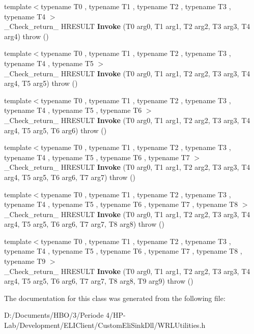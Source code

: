 \begin{DoxyCompactItemize}
{\footnotesize template$<$typename T0 , typename T1 , typename T2 , typename T3 , typename T4 $>$ }\\\+\_\+\+Check\+\_\+return\+\_\+ H\+R\+E\+S\+U\+LT {\bfseries Invoke} (T0 arg0, T1 arg1, T2 arg2, T3 arg3, T4 arg4)  throw ()
\item 
\mbox{\label{class_context_event_wrapper_a3d86a67a3676160dd8ed4d17c3fb8407}} 
{\footnotesize template$<$typename T0 , typename T1 , typename T2 , typename T3 , typename T4 , typename T5 $>$ }\\\+\_\+\+Check\+\_\+return\+\_\+ H\+R\+E\+S\+U\+LT {\bfseries Invoke} (T0 arg0, T1 arg1, T2 arg2, T3 arg3, T4 arg4, T5 arg5)  throw ()
\item 
\mbox{\label{class_context_event_wrapper_a2271af1251747a216123f181536c4f8b}} 
{\footnotesize template$<$typename T0 , typename T1 , typename T2 , typename T3 , typename T4 , typename T5 , typename T6 $>$ }\\\+\_\+\+Check\+\_\+return\+\_\+ H\+R\+E\+S\+U\+LT {\bfseries Invoke} (T0 arg0, T1 arg1, T2 arg2, T3 arg3, T4 arg4, T5 arg5, T6 arg6)  throw ()
\item 
\mbox{\label{class_context_event_wrapper_ab85cf71af41dcc3317874753590835fa}} 
{\footnotesize template$<$typename T0 , typename T1 , typename T2 , typename T3 , typename T4 , typename T5 , typename T6 , typename T7 $>$ }\\\+\_\+\+Check\+\_\+return\+\_\+ H\+R\+E\+S\+U\+LT {\bfseries Invoke} (T0 arg0, T1 arg1, T2 arg2, T3 arg3, T4 arg4, T5 arg5, T6 arg6, T7 arg7)  throw ()
\item 
\mbox{\label{class_context_event_wrapper_ae82198c30c542ab9a8e2698a94605e0b}} 
{\footnotesize template$<$typename T0 , typename T1 , typename T2 , typename T3 , typename T4 , typename T5 , typename T6 , typename T7 , typename T8 $>$ }\\\+\_\+\+Check\+\_\+return\+\_\+ H\+R\+E\+S\+U\+LT {\bfseries Invoke} (T0 arg0, T1 arg1, T2 arg2, T3 arg3, T4 arg4, T5 arg5, T6 arg6, T7 arg7, T8 arg8)  throw ()
\item 
\mbox{\label{class_context_event_wrapper_aafee18bbd9da8f8ec8efd921ed7b8353}} 
{\footnotesize template$<$typename T0 , typename T1 , typename T2 , typename T3 , typename T4 , typename T5 , typename T6 , typename T7 , typename T8 , typename T9 $>$ }\\\+\_\+\+Check\+\_\+return\+\_\+ H\+R\+E\+S\+U\+LT {\bfseries Invoke} (T0 arg0, T1 arg1, T2 arg2, T3 arg3, T4 arg4, T5 arg5, T6 arg6, T7 arg7, T8 arg8, T9 arg9)  throw ()
\end{DoxyCompactItemize}


The documentation for this class was generated from the following file\+:\begin{DoxyCompactItemize}
\item 
D\+:/\+Documents/\+H\+B\+O/3/\+Periode 4/\+H\+P-\/\+Lab/\+Development/\+E\+L\+I\+Client/\+Custom\+Eli\+Sink\+Dll/W\+R\+L\+Utilities.\+h\end{DoxyCompactItemize}
